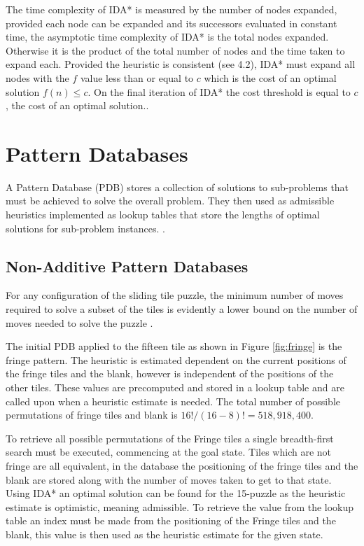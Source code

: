 \documentclass[final]{cmpreport}
\begin{document}
The time complexity of IDA* is measured by the number of nodes expanded, provided each node can be expanded and its successors evaluated in constant time, the asymptotic time complexity of IDA* is the total nodes expanded. Otherwise it is the product of the total number of nodes and the time taken to expand each. Provided the heuristic is consistent (see 4.2), IDA* must expand all nodes with the $f$ value less than or equal to $c$ which  is the cost of an optimal solution $f(n) \leq c$. On the final iteration of IDA* the cost threshold is equal to $c$, the cost of an optimal solution.\citep{DBLP:journals/ai/KorfRE01}.


\section{Pattern Databases}
A Pattern Database (PDB) stores a collection of solutions to sub-problems that must be achieved to solve the overall problem. They then used as admissible heuristics implemented as lookup tables that store the lengths of optimal solutions for sub-problem instances. \citep{DBLP:journals/jair/FelnerKMH07}.

\subsection{Non-Additive Pattern Databases}\label{Section:nonadditive}
For any configuration of the sliding tile puzzle, the minimum number of moves required to solve a subset of the tiles is evidently a lower bound on the number of moves needed to solve the puzzle \cite{felner2004additive}.





The initial PDB applied to the fifteen tile as shown in Figure \ref{fig:fringe} is the fringe pattern. The heuristic is estimated dependent on the current positions of the fringe tiles and the blank, however is independent of the positions of the other tiles. These values are precomputed and stored in a lookup table and are called upon when a heuristic estimate is needed. The total number of possible permutations of fringe tiles and blank is $16!/(16-8)!=518,918,400$. 

To retrieve all possible permutations of the Fringe tiles a single breadth-first search must be executed, commencing at the goal state. Tiles which are not fringe are all equivalent, in the database the positioning of the fringe tiles and the blank are stored along with the number of moves taken to get to that state. Using IDA* an optimal solution can be found for the 15-puzzle as the heuristic estimate is optimistic, meaning admissible. To retrieve the value from the lookup table an index must be made from the positioning of the Fringe tiles and the blank, this value is then used as the heuristic estimate for the given state.
\end{document}
